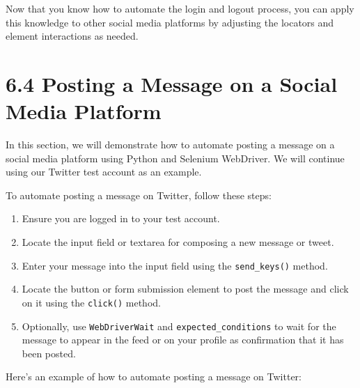 \documentclass[
  paper=a4,
  ,captions=tableheading
]{scrartcl}
\providecommand{\tightlist}{%
  \setlength{\itemsep}{0pt}\setlength{\parskip}{0pt}}
\begin{document}
Now that you know how to automate the login and logout process, you can
apply this knowledge to other social media platforms by adjusting the
locators and element interactions as needed.

\hypertarget{posting-a-message-on-a-social-media-platform}{%
\section{6.4 Posting a Message on a Social Media
Platform}\label{posting-a-message-on-a-social-media-platform}}

In this section, we will demonstrate how to automate posting a message
on a social media platform using Python and Selenium WebDriver. We will
continue using our Twitter test account as an example.

To automate posting a message on Twitter, follow these steps:

\begin{enumerate}
\def\labelenumi{\arabic{enumi}.}
\tightlist
\item
  Ensure you are logged in to your test account.
\item
  Locate the input field or textarea for composing a new message or
  tweet.
\item
  Enter your message into the input field using the
  \texttt{send\_keys()} method.
\item
  Locate the button or form submission element to post the message and
  click on it using the \texttt{click()} method.
\item
  Optionally, use \texttt{WebDriverWait} and
  \texttt{expected\_conditions} to wait for the message to appear in the
  feed or on your profile as confirmation that it has been posted.
\end{enumerate}

Here's an example of how to automate posting a message on Twitter:
\end{document}
